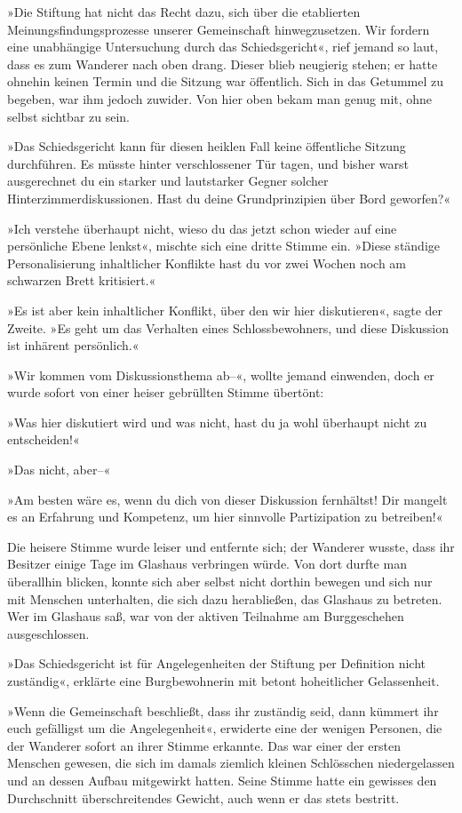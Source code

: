 »Die Stiftung hat nicht das Recht dazu, sich über die etablierten Meinungsfindungsprozesse unserer Gemeinschaft hinwegzusetzen. Wir fordern eine unabhängige Untersuchung durch das Schiedsgericht«, rief jemand so laut, dass es zum Wanderer nach oben drang. Dieser blieb neugierig stehen; er hatte ohnehin keinen Termin und die Sitzung war öffentlich. Sich in das Getummel zu begeben, war ihm jedoch zuwider. Von hier oben bekam man genug mit, ohne selbst sichtbar zu sein.

»Das Schiedsgericht kann für diesen heiklen Fall keine öffentliche Sitzung durchführen. Es müsste hinter verschlossener Tür tagen, und bisher warst ausgerechnet du ein starker und lautstarker Gegner solcher Hinterzimmerdiskussionen. Hast du deine Grundprinzipien über Bord geworfen?«

»Ich verstehe überhaupt nicht, wieso du das jetzt schon wieder auf eine persönliche Ebene lenkst«, mischte sich eine dritte Stimme ein. »Diese ständige Personalisierung inhaltlicher Konflikte hast du vor zwei Wochen noch am schwarzen Brett kritisiert.«

»Es ist aber kein inhaltlicher Konflikt, über den wir hier diskutieren«, sagte der Zweite. »Es geht um das Verhalten eines Schlossbewohners, und diese Diskussion ist inhärent persönlich.«

»Wir kommen vom Diskussionsthema ab–«, wollte jemand einwenden, doch er wurde sofort von einer heiser gebrüllten Stimme übertönt:

»Was hier diskutiert wird und was nicht, hast du ja wohl überhaupt nicht zu entscheiden!«

»Das nicht, aber–«

»Am besten wäre es, wenn du dich von dieser Diskussion fernhältst! Dir mangelt es an Erfahrung und Kompetenz, um hier sinnvolle Partizipation zu betreiben!«

Die heisere Stimme wurde leiser und entfernte sich; der Wanderer wusste, dass ihr Besitzer einige Tage im Glashaus verbringen würde. Von dort durfte man überallhin blicken, konnte sich aber selbst nicht dorthin bewegen und sich nur mit Menschen unterhalten, die sich dazu herabließen, das Glashaus zu betreten. Wer im Glashaus saß, war von der aktiven Teilnahme am Burggeschehen ausgeschlossen.

»Das Schiedsgericht ist für Angelegenheiten der Stiftung per Definition nicht zuständig«, erklärte eine Burgbewohnerin mit betont hoheitlicher Gelassenheit.

»Wenn die Gemeinschaft beschließt, dass ihr zuständig seid, dann kümmert ihr euch gefälligst um die Angelegenheit«, erwiderte eine der wenigen Personen, die der Wanderer sofort an ihrer Stimme erkannte. Das war einer der ersten Menschen gewesen, die sich im damals ziemlich kleinen Schlösschen niedergelassen und an dessen Aufbau mitgewirkt hatten. Seine Stimme hatte ein gewisses den Durchschnitt überschreitendes Gewicht, auch wenn er das stets bestritt.

